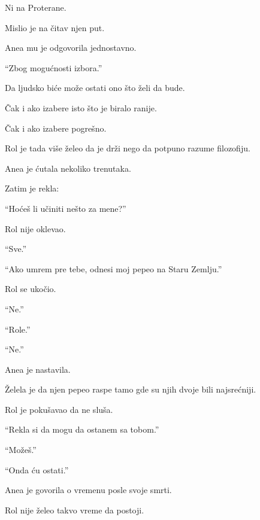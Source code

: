 Ni na Proterane.

\bigskip

Mislio je na čitav njen put.

\bigskip

Anea mu je odgovorila jednostavno.

``Zbog mogućnosti izbora.''

\bigskip

Da ljudsko biće može ostati ono što želi da bude.

\bigskip

Čak i ako izabere isto što je biralo ranije.

\bigskip

Čak i ako izabere pogrešno.

\bigskip

Rol je tada više želeo da je drži nego da potpuno razume filozofiju.

\bigskip

Anea je ćutala nekoliko trenutaka.

Zatim je rekla:

``Hoćeš li učiniti nešto za mene?''

\bigskip

Rol nije oklevao.

``Sve.''

\bigskip

``Ako umrem pre tebe, odnesi moj pepeo na Staru Zemlju.''

\bigskip

Rol se ukočio.

\bigskip

``Ne.''

\bigskip

``Role.''

``Ne.''

\bigskip

Anea je nastavila.

Želela je da njen pepeo raspe tamo gde su njih dvoje bili najsrećniji.

\bigskip

Rol je pokušavao da ne sluša.

``Rekla si da mogu da ostanem sa tobom.''

``Možeš.''

\bigskip

``Onda ću ostati.''

\bigskip

Anea je govorila o vremenu posle svoje smrti.

Rol nije želeo takvo vreme da postoji.

